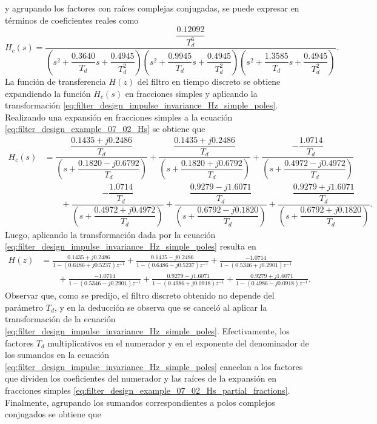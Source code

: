 \documentclass[a4paper]{report}
\begin{document}
y agrupando los factores con raíces complejas conjugadas, se puede expresar en términos de coeficientes reales como
\[
 H_c(s)=\dfrac{\dfrac{0.12092}{T_d^6}}{\left(s^2+\dfrac{0.3640}{T_d}s+\dfrac{0.4945}{T_d^2}\right)
  \left(s^2+\dfrac{0.9945}{T_d}s+\dfrac{0.4945}{T_d^2}\right)\left(s^2+\dfrac{1.3585}{T_d}s+\dfrac{0.4945}{T_d^2}\right)}.
\]
La función de transferencia \(H(z)\) del filtro en tiempo discreto se obtiene expandiendo la función \(H_c(s)\) en fracciones simples y aplicando la transformación \ref{eq:filter_design_impulse_invariance_Hz_simple_poles}. Realizando una expansión en fracciones simples a la ecuación \ref{eq:filter_design_example_07_02_Hs} se obtiene que 
\begin{equation}\label{eq:filter_design_example_07_02_Hs_partial_fractions}
 \begin{aligned}
   H_c(s)&=\dfrac{\dfrac{0.1435+j0.2486}{T_d}}{\left(s+\dfrac{0.1820-j0.6792}{T_d}\right)}
    +\dfrac{\dfrac{0.1435+j0.2486}{T_d}}{\left(s+\dfrac{0.1820+j0.6792}{T_d}\right)}
    +\dfrac{-\dfrac{1.0714}{T_d}}{\left(s+\dfrac{0.4972-j0.4972}{T_d}\right)}\\
   &\qquad +\dfrac{-\dfrac{1.0714}{T_d}}{\left(s+\dfrac{0.4972+j0.4972}{T_d}\right)}
    +\dfrac{\dfrac{0.9279-j1.6071}{T_d}}{\left(s+\dfrac{0.6792-j0.1820}{T_d}\right)}
    +\dfrac{\dfrac{0.9279+j1.6071}{T_d}}{\left(s+\dfrac{0.6792+j0.1820}{T_d}\right)}.  
 \end{aligned}
\end{equation}
Luego, aplicando la transformación dada por la ecuación \ref{eq:filter_design_impulse_invariance_Hz_simple_poles} resulta en
\begin{align*}
 H(z)&=\frac{0.1435+j0.2486}{1-(0.6486+j0.5237)z^{-1}}+\frac{0.1435-j0.2486}{1-(0.6486-j0.5237)z^{-1}}
   +\frac{-1.0714}{1-(0.5346+j0.2901)z^{-1}}\\
   &\qquad+\frac{-1.0714}{1-(0.5346-j0.2901)z^{-1}}+\frac{0.9279-j1.6071}{1-(0.4986+j0.0918)z^{-1}}
    +\frac{0.9279+j1.6071}{1-(0.4986-j0.0918)z^{-1}}.
\end{align*}
Observar que, como se predijo, el filtro discreto obtenido no depende del parámetro \(T_d\), y en la deducción se observa que se canceló al aplicar la transformación de la ecuación \ref{eq:filter_design_impulse_invariance_Hz_simple_poles}. Efectivamente, los factores \(T_d\) multiplicativos en el numerador y en el exponente del denominador de los sumandos en la ecuación \ref{eq:filter_design_impulse_invariance_Hz_simple_poles} cancelan a los factores que dividen los coeficientes del numerador y las raíces de la expansión en fracciones simples \ref{eq:filter_design_example_07_02_Hs_partial_fractions}. Finalmente, agrupando los sumandos correspondientes a polos complejos conjugados se obtiene que 
\end{document}
